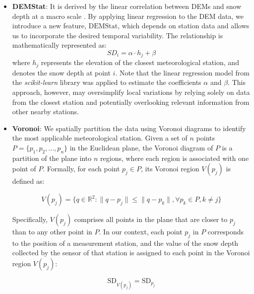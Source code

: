 \documentclass[preprint,12pt]{elsarticle}
\begin{document}
\begin{itemize}
    \item \textbf{DEMStat}: It is derived by the linear correlation between DEMs and snow depth at a macro scale \cite{Grunewald2014}. By applying linear regression to the DEM data, we introduce a new feature, $\text{DEMStat}$, which depends on station data and allows us to incorporate the desired temporal variability. The relationship is mathematically represented as:
    \begin{equation}
    \text{$SD_{i}$} = \alpha \cdot h_j + \beta
    \end{equation}
    \noindent where $h_j$ represents the elevation of the closest meteorological station, and  denotes the snow depth at point $i$. %
    Note that the linear regression model from the \textit{scikit-learn} library \cite{kramer2016scikit} was applied to estimate the coefficients $\alpha$ and $\beta$. This approach, however, may oversimplify local variations by relying solely on data from the closest station and potentially overlooking relevant information from other nearby stations.
    
    \item \textbf{Voronoi}: We spatially partition the data using Voronoi diagrams to identify the most applicable meteorological station. %
    Given a set of $n$ points $P = \{p_1, p_2, ..., p_n\}$ in the Euclidean plane, the Voronoi diagram of $P$ %
    is a partition of the plane into $n$ regions, where each region is associated with one point of $P$. Formally, for each point $p_j \in P$, its Voronoi region $V(p_j)$ is defined as:

    \begin{equation}
    V(p_j) = 
    \{ q \in \mathbb{R}^2: \|q - p_j\| \leq \|q - p_k\|, \forall p_k \in P, k \neq j \}
    \end{equation}

    Specifically, $V(p_j)$ comprises all points in the plane that are closer to $p_j$ than to any other point in $P$. In our context, each point $p_j$ in $P$ corresponds to the position of a measurement station, and the value of the snow depth collected by the sensor of that station is assigned to each point in the Voronoi region $V(p_j)$: 

    \begin{equation}
    \text{SD}_{V(p_j)} = \text{SD}_{p_j}
    \end{equation}


\end{itemize}
\end{document}
